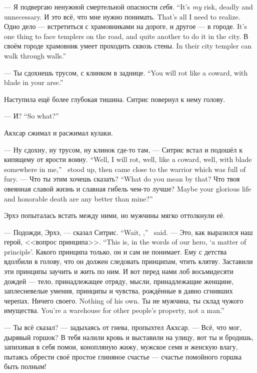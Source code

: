 {--- Я подвергаю ненужной смертельной опасности \emph{себя}.}
{``It's \emph{my} risk, deadly and unnecessary.}
{И это всё, что мне нужно понимать.}
{That's all I need to realize.}
{Одно дело --- встретиться с храмовниками на дороге, и другое --- в городе.}
{It's one thing to face templers on the road, and quite another to do it in the city.}
{В своём городе храмовник умеет проходить сквозь стены.}
{In their city templer can walk through walls.''}

{--- Ты сдохнешь трусом, с клинком в заднице.}
{``You will rot like a coward, with blade in your arse.''}

Наступила ещё более глубокая тишина.
Ситрис повернул к нему голову.

{--- И?}
{``So what?''}

Акхсар сжимал и расжимал кулаки.

{--- Ну сдохну, ну трусом, ну клинок где-то там, --- Ситрис встал и подошёл к кипящему от ярости воину.}
{``Well, I will rot, well, like a coward, well, with blade somewhere in me,'' \Sitris\ stood up, then came close to the warrior which was full of fury.}
{--- Что ты этим хочешь сказать?}
{``What do you mean by that?}
{Что твоя овеянная славой жизнь и славная гибель чем-то лучше?}
{Maybe your glorious life and honorable death are any better than mine?''}

Эрхэ попыталась встать между ними, но мужчины мягко оттолкнули её.

{--- Подожди, Эрхэ, --- сказал Ситрис.}
{``Wait, \Oerchoe,'' \Sitris\ said.}
{--- Это, как выразился наш герой, <<вопрос принципа>>.}
{``This is, in the words of our hero, `a matter of principle'.}
Какого принципа только, он и сам не понимает.
Ему с детства вдолбили в голову, что он должен следовать принципам, чтить клятву.
Заставили эти принципы заучить и жить по ним.
И вот перед нами лоб восьмидесяти дождей --- тело, принадлежащее отряду, мысли, принадлежащие женщине, заплесневелые умения, принципы и чувства, рождённые в давно сгнивших черепах.
{Ничего своего.}
{Nothing of his own.}
{Ты не мужчина, ты склад чужого имущества.}
{You're a warehouse for other people's property, not a man.''}

--- Ты всё сказал? --- задыхаясь от гнева, пропыхтел Акхсар.
--- Всё, что мог, дырявый горшок?
В тебя налили кровь и выставили на улицу, вот ты и бродишь, запихивая в себя помои, конопляную жижу, мужское семя и женскую влагу, пытаясь обрести своё простое глиняное счастье --- счастье помойного горшка быть полным!

